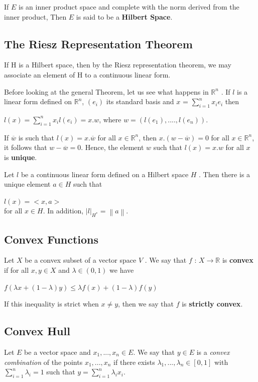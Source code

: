 \documentclass[12 pt]{article}
\theoremstyle{definition}
\theoremstyle{remark}
\newcommand{\R}{\mathbb{R}}
\newcommand\norm[1]{\left\lVert#1\right\rVert}
\begin{document}
If $E$ is an inner product space and complete with the norm derived from the inner product, Then $E$ is said to be a \textbf{Hilbert Space}.

\subsection{The Riesz Representation Theorem}
If H is a Hilbert space, then by the Riesz representation theorem, we may associate an element of H to a continuous linear form.

Before looking at the general Theorem, let us see what
happens in $\R^n$ . If $l$ is a linear form defined on $\R^n$, $(e_i)$ its standard basis and 
$x$ = $\sum_{i = 1}^{n} x_i e_i$ then

\hspace*{2cm} $l(x) = \sum_{i=1}^{n} x_i l(e_i) = x . w$, where $w = (l(e_1), ...., l(e_n))$.

If $\overline{w}$ is such that $l(x) = x. \overline{w}$ for all $x \in \R^n$, then $x.(w - \overline{w}) = 0$ for all $x \in \R^n$, it follows that $ w - \overline{w} = 0$. Hence, the element $w$ such that $l(x) = x.w$ for all $x$ is \textbf{unique}.

\theorem Let $l$ be a continuous linear form defined on a Hilbert space $H$ . Then there is a unique element $a \in  H$ such that

\hspace*{3cm} $l(x) = <x, a>$ \\
for all $x \in H$. In addition, $|l|_{H^{*}} = \norm{a}$.

\normalfont
\subsection{Convex Functions}
Let $X$ be a convex subset of a vector space $V$ . We say that $f$ : $X \to \R$ is \textbf{convex} if for all $x, y \in X$ and $ \lambda \in (0,1)$ we have 

\hspace*{2cm} $ f\left( \lambda x + (1- \lambda ) y\right) \leq \lambda f(x) + (1-\lambda) f(y)$

If this inequality is strict when $x \neq y$, then we say that $f$ is \textbf{strictly convex}.

\subsection{Convex Hull}
Let $E$ be a vector space and $x_1 ,..., x_n \in E$. We say that $y \in E$ is a \textit{convex combination} of the points $x_1 ,..., x_n$ if there exists $\lambda_1 ,..., \lambda_n \in [0,1]$ with $\sum_{i=1}^n \lambda_i = 1$ such that $ y = \sum_{i=1}^n \lambda_i x_i$.
\end{document}
